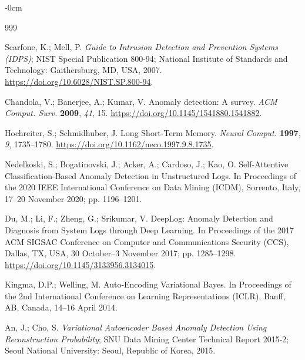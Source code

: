 \documentclass[futureinternet,article,accept,moreauthors]{Definitions/mdpi}
\begin{document}
\begin{adjustwidth}{-\extralength}{0cm}
\begin{thebibliography}{999}

Scarfone, K.; Mell, P. \emph{Guide to Intrusion Detection and Prevention Systems (IDPS)}; NIST Special Publication 800-94; National Institute of Standards and Technology: Gaithersburg, MD, USA, 2007. \url{https://doi.org/10.6028/NIST.SP.800-94}.

Chandola, V.; Banerjee, A.; Kumar, V. Anomaly detection: A survey. \emph{ACM Comput. Surv.} \textbf{2009}, \emph{41}, 15. \url{https://doi.org/10.1145/1541880.1541882}.

Hochreiter, S.; Schmidhuber, J. Long Short-Term Memory. \emph{Neural Comput.} \textbf{1997}, \emph{9}, 1735--1780. \url{https://doi.org/10.1162/neco.1997.9.8.1735}.

Nedelkoski, S.; Bogatinovski, J.; Acker, A.; Cardoso, J.; Kao, O. Self-Attentive Classification-Based Anomaly Detection in Unstructured Logs. In Proceedings of the 2020 IEEE International Conference on Data Mining (ICDM), Sorrento, Italy, 17--20 November 2020; pp. 1196--1201.  %

Du, M.; Li, F.; Zheng, G.; Srikumar, V. DeepLog: Anomaly Detection and Diagnosis from System Logs through Deep Learning. In Proceedings of the 2017 ACM SIGSAC Conference on Computer and Communications Security (CCS), Dallas, TX, USA, 30 October--3 November 2017; pp. 1285--1298. \url{https://doi.org/10.1145/3133956.3134015}.

Kingma, D.P.; Welling, M. Auto-Encoding Variational Bayes. In Proceedings of the 2nd International Conference on Learning Representations (ICLR), Banff, AB, Canada, 14--16 April 2014. 

An, J.; Cho, S. \emph{Variational Autoencoder Based Anomaly Detection Using Reconstruction Probability}; SNU Data Mining Center Technical Report 2015-2; Seoul National University: Seoul, Republic of Korea, 2015.


\end{thebibliography}
\end{adjustwidth}
\end{document}
